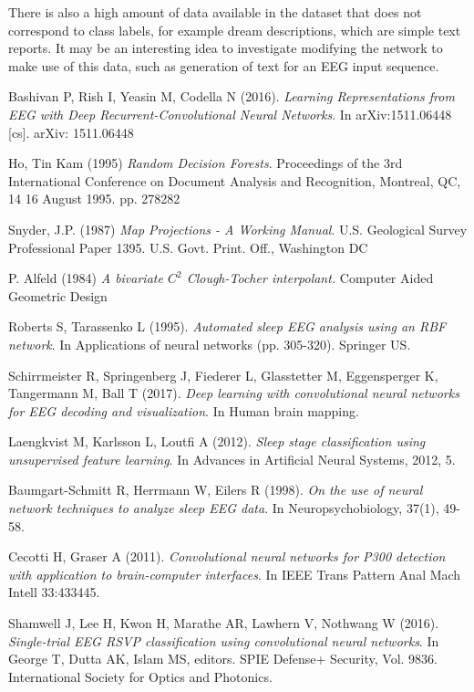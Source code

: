 \documentclass{article}
\begin{document}
There is also a high amount of data available in the dataset that does not correspond to class labels, for example dream descriptions, which are simple text reports. It may be an interesting idea to investigate modifying the network to make use of this data, such as generation of text for an EEG input sequence. 
\begin{thebibliography}{99}

	Bashivan  P,  Rish  I,  Yeasin  M,  Codella  N  (2016). 
	\textit{Learning  Representations from  EEG with  Deep Recurrent-Convolutional  Neural Networks}. 
	In arXiv:1511.06448 [cs]. arXiv: 1511.06448

	Ho, Tin Kam (1995)
	\textit{Random Decision Forests}. 
	Proceedings of the 3rd International Conference on Document Analysis and Recognition, Montreal, QC, 14		16 August 1995. pp. 278282

	Snyder, J.P. (1987) 
	\textit{Map Projections - A Working Manual}. 
	U.S. Geological Survey Professional Paper 1395. U.S. Govt. Print.
	Off., Washington DC
	
	P. Alfeld (1984)
	\textit{A bivariate $C^2$ Clough-Tocher interpolant.} 
	Computer Aided Geometric Design

	Roberts S, Tarassenko L (1995).
	\textit{Automated sleep EEG analysis using an RBF network}.
	In Applications of neural networks (pp. 305-320). Springer US.

	Schirrmeister R, Springenberg J, Fiederer L, Glasstetter M, Eggensperger K, Tangermann M, Ball T (2017). 
	\textit{Deep learning with convolutional neural networks for EEG decoding and visualization}.
	In Human brain mapping.

	Laengkvist M, Karlsson L, Loutfi A (2012).
	\textit{Sleep stage classification using unsupervised feature learning}.
	In Advances in Artificial Neural Systems, 2012, 5.

	Baumgart-Schmitt R, Herrmann W, Eilers R (1998). 
	\textit{On the use of neural network techniques to analyze sleep EEG data}.
	In Neuropsychobiology, 37(1), 49-58.

	Cecotti H, Graser A (2011).
	\textit{Convolutional neural networks for P300 detection with application to brain-computer interfaces}. 
	In IEEE Trans Pattern Anal Mach Intell 33:433445.

	Shamwell J, Lee H, Kwon H, Marathe AR, Lawhern V, Nothwang W (2016).
	\textit{Single-trial EEG RSVP classification using convolutional neural networks}. 
	In George T, Dutta AK, Islam MS, editors. SPIE Defense+ Security, Vol. 9836. International Society for Optics and Photonics.


\end{thebibliography}
\end{document}
